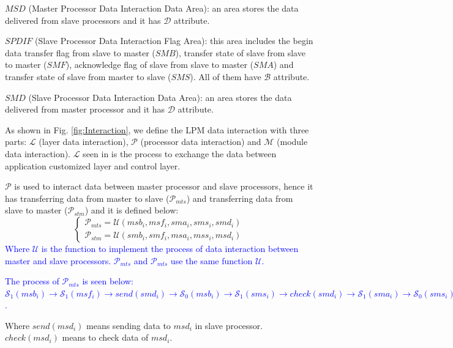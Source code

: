 \documentclass[journal,UTF8]{IEEEtran}
\begin{document}
\textbf{$MSD$} (Master Processor Data Interaction Data Area): an area stores the data delivered from slave processors and it has $\mathcal{D}$ attribute.

\textbf{$SPDIF$} (Slave Processor Data Interaction Flag Area): this area includes the begin data transfer flag from slave to master ($SMB$), transfer state of slave from slave to master ($SMF$), acknowledge flag of slave from slave to master ($SMA$) and transfer state of slave from master to slave ($SMS$). All of them have $\mathcal{B}$ attribute.

\textbf{$SMD$} (Slave Processor Data Interaction Data Area): an area stores the data delivered from master processor and it has $\mathcal{D}$ attribute.

 As shown in Fig. \ref{fig:Interaction}, we define the LPM data interaction with three parts: $\mathcal{L}$ (layer data interaction), $\mathcal{P}$ (processor data interaction) and $\mathcal{M}$ (module data interaction). $\mathcal{L}$ seen in \cite{WuA} is the process to exchange the data between application customized layer and control layer.
 
 $\mathcal{P}$ is used to interact data between master processor and slave processors, hence it has transferring data from master to slave ($\mathcal{P}_{mts}$) and transferring data from slave to master ($\mathcal{P}_{stm}$) and it is defined below:
 \begin{equation}
 \left\{
 \begin{array}{l}
 \mathcal{P}_{mts} = \mathcal{U} (msb_i,msf_i,sma_i,sms_i,smd_i)\\
 \mathcal{P}_{stm} = \mathcal{U} (smb_i,smf_i,msa_i,mss_i,msd_i)
 \end{array}
 \right.
 \end{equation}
 \textcolor{blue}{Where $\mathcal{U}$ is the function to implement the process of data interaction between master and slave processors. $\mathcal{P}_{mts}$ and $\mathcal{P}_{mts}$ use the same function $\mathcal{U}$.}
 
 \textcolor{blue}{The process of $\mathcal{P}_{mts}$ is seen below:
 	$\mathcal{S}_1(msb_i)\to\mathcal{S}_1(msf_i)\to send(smd_i)\to\mathcal{S}_0(msb_i)\to\mathcal{S}_1(sms_i)\to check(smd_i)\to\mathcal{S}_1(sma_i)\to\mathcal{S}_0(sms_i)\to\mathcal{S}_0(sma_i)\to\mathcal{S}_0(msf_i)$.}
 
 Where $send(msd_i)$ means sending data to $msd_i$ in slave processor. $check(msd_i)$ means to check data of $msd_i$.
 
\end{document}
